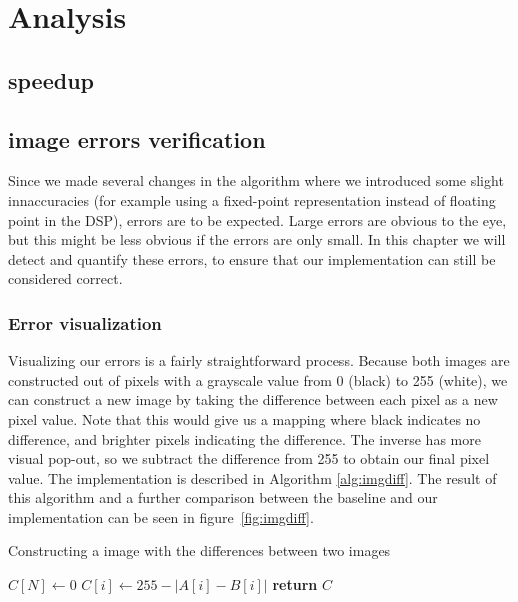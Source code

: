 \section{Analysis}
\subsection{speedup}
\subsection{image errors verification}
Since we made several changes in the algorithm where we introduced some slight innaccuracies (for example using a fixed-point representation instead of floating point in the DSP), errors are to be expected. Large errors are obvious to the eye, but this might be less obvious if the errors are only small. In this chapter we will detect and quantify these errors, to ensure that our implementation can still be considered correct.

\subsubsection{Error visualization}
Visualizing our errors is a fairly straightforward process. Because both images are constructed out of pixels with a grayscale value from 0 (black) to 255 (white), we can construct a new image by taking the difference between each pixel as a new pixel value. Note that this would give us a mapping where black indicates no difference, and brighter pixels indicating the difference. The inverse has more visual pop-out, so we subtract the difference from 255 to obtain our final pixel value. The implementation is described in Algorithm \ref{alg:imgdiff}. The result of this algorithm and a further comparison between the baseline and our implementation can be seen in figure~\ref{fig:imgdiff}.

\begin{algorithm}[t]
    \caption{Constructing a image with the differences between two images}\label{alg:imgdiff}
    \begin{algorithmic}[1]
          
        \State $C[N]\gets 0$
           \State $C[i]\gets 255 - |A[i] - B[i]|$   
        \EndFor
        \State \textbf{return} $C$
        \EndProcedure
    \end{algorithmic}
\end{algorithm}


